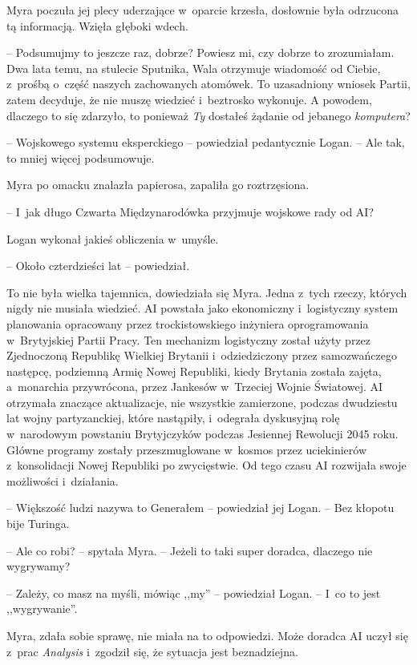 \documentclass[oneside,polish,11pt,sfheadings]{mwbk}
\begin{document}
Myra poczuła jej plecy uderzające w~oparcie krzesła, dosłownie była
odrzucona tą informacją. Wzięła głęboki wdech.

-- Podsumujmy to jeszcze raz, dobrze? Powiesz mi, czy dobrze to
zrozumiałam. Dwa lata temu, na stulecie Sputnika, Wala otrzymuje
wiadomość od Ciebie, z~prośbą o~część naszych zachowanych atomówek. To
uzasadniony wniosek Partii, zatem decyduje, że nie muszę wiedzieć i~beztrosko wykonuje. A powodem, dlaczego to się zdarzyło, to ponieważ
\textit{Ty} dostałeś żądanie od jebanego \textit{komputera}?

-- Wojskowego systemu eksperckiego -- powiedział pedantycznie Logan. -- Ale
tak, to mniej więcej podsumowuje.

Myra po omacku znalazła papierosa, zapaliła go roztrzęsiona.

-- I~jak długo Czwarta Międzynarodówka przyjmuje wojskowe rady od AI?

Logan wykonał jakieś obliczenia w~umyśle.

-- Około czterdzieści lat -- powiedział.

To nie była wielka tajemnica, dowiedziała się Myra. Jedna z~tych rzeczy,
których nigdy nie musiała wiedzieć. AI powstała jako ekonomiczny i~logistyczny system planowania opracowany przez trockistowskiego
inżyniera oprogramowania w~Brytyjskiej Partii Pracy. Ten mechanizm
logistyczny został użyty przez Zjednoczoną Republikę Wielkiej Brytanii i~odziedziczony przez samozwańczego następcę, podziemną Armię Nowej
Republiki, kiedy Brytania została zajęta, a~monarchia przywrócona, przez
Jankesów w~Trzeciej Wojnie Światowej. AI otrzymała znaczące
aktualizacje, nie wszystkie zamierzone, podczas dwudziestu lat wojny
partyzanckiej, które nastąpiły, i~odegrała dyskusyjną rolę w~narodowym
powstaniu Brytyjczyków podczas Jesiennej Rewolucji 2045 roku. Główne
programy zostały przeszmuglowane w~kosmos przez uciekinierów z~konsolidacji Nowej Republiki po zwycięstwie. Od tego czasu AI rozwijała
swoje możliwości i~działania.

-- Większość ludzi nazywa to Generałem -- powiedział jej Logan. -- Bez
kłopotu bije Turinga.

-- Ale co robi? -- spytała Myra. -- Jeżeli to taki super doradca, dlaczego
nie wygrywamy?

-- Zależy, co masz na myśli, mówiąc ,,my'' -- powiedział Logan. -- I~co to
jest ,,wygrywanie''.

Myra, zdała sobie sprawę, nie miała na to odpowiedzi. Może doradca AI
uczył się z~prac \textit{Analysis} i~zgodził się, że sytuacja jest
beznadziejna.
\end{document}
